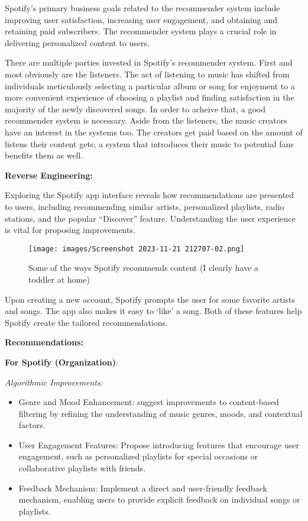 \documentclass[
]{article}
\begin{document}
Spotify's primary business goals related to the recommender system
include improving user satisfaction, increasing user engagement, and
obtaining and retaining paid subscribers. The recommender system plays a
crucial role in delivering personalized content to users.

There are multiple parties invested in Spotify's recommender system.
First and most obviously are the listeners. The act of listening to
music has shifted from individuals meticulously selecting a particular
album or song for enjoyment to a more convenient experience of choosing
a playlist and finding satisfaction in the majority of the newly
discovered songs. In order to acheive that, a good recommender system is
necessary. Aside from the listeners, the music creators have an interest
in the systems too. The creators get paid based on the amount of listens
their content gets; a system that introduces their music to potential
fans benefits them as well.

\textbf{Reverse Engineering:}

Exploring the Spotify app interface reveals how recommendations are
presented to users, including recommending similar artists, personalized
playlists, radio stations, and the popular ``Discover'' feature.
Understanding the user experience is vital for proposing improvements.

\begin{figure}
\centering
\texttt{[image: images/Screenshot 2023-11-21 212707-02.png]}
\caption{Some of the ways Spotify recommends content (I clearly have a
toddler at home)}
\end{figure}

Upon creating a new account, Spotify prompts the user for some favorite
artists and songs. The app also makes it easy to `like' a song. Both of
these features help Spotify create the tailored recommendations.

\textbf{Recommendations:}

\textbf{For Spotify (Organization)}:

\emph{Algorithmic Improvements:}

\begin{itemize}
\item
  Genre and Mood Enhancement: suggest improvements to content-based
  filtering by refining the understanding of music genres, moods, and
  contextual factors.
\item
  User Engagement Features: Propose introducing features that encourage
  user engagement, such as personalized playlists for special occasions
  or collaborative playlists with friends.
\item
  Feedback Mechanism: Implement a direct and user-friendly feedback
  mechanism, enabling users to provide explicit feedback on individual
  songs or playlists.
\end{itemize}
\end{document}
